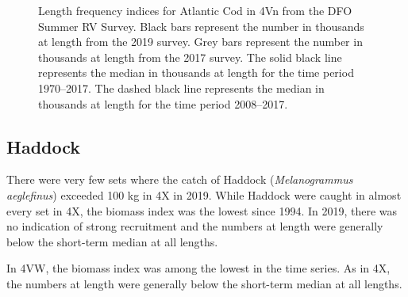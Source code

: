 \documentclass[11pt]{book}
\begin{document}
\begin{figure}[htb]

{\centering {} 

}

\caption{Length frequency indices for Atlantic Cod in 4Vn from the DFO Summer RV Survey. Black bars represent the number in thousands at length from the 2019 survey. Grey bars represent the number in thousands at length from the 2017 survey. The solid black line represents the median in thousands at length for the time period 1970--2017. The dashed black line represents the median in thousands at length for the time period 2008--2017.}\label{fig:13-fig-cod-lengthfreq4Vn}
\end{figure}
\clearpage

\hypertarget{haddock}{%
\subsection{Haddock}\label{haddock}}

There were very few sets where the catch of Haddock (\emph{Melanogrammus aeglefinus}) exceeded 100 kg in 4X in 2019. While Haddock were caught in almost every set in 4X, the biomass index was the lowest since 1994. In 2019, there was no indication of strong recruitment and the numbers at length were generally below the short-term median at all lengths.

In 4VW, the biomass index was among the lowest in the time series. As in 4X, the numbers at length were generally below the short-term median at all lengths.
\end{document}
